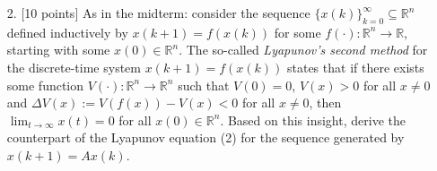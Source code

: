 \documentclass[a4paper,10.5pt]{article}
\begin{document}
\begin{itemize}
\item[2.] $[$10 points$]$ As in the midterm: consider the sequence $\{x(k)\}_{k=0}^\infty \subseteq \mathbb{R}^n$ defined inductively by 
$x(k+1)=f(x(k))$ for some $f(\cdot):\mathbb{R}^n \rightarrow \mathbb{R}$, starting with some $x(0)\in \mathbb{R}^n$. The so-called \emph{Lyapunov's second method} for the discrete-time system $x(k+1)=f(x(k))$ states that if there exists some function $V(\cdot):\mathbb{R}^n \rightarrow \mathbb{R}^n$ such that $V(0)=0$, $V(x) > 0$ for all $x\neq 0$ and $\Delta V(x):=V(f(x)) - V(x)<0$ for all $x\neq 0$, then $\lim_{t \rightarrow \infty} x(t) =0$ for all $x(0) \in \mathbb{R}^n$. Based on this insight, derive the counterpart of the Lyapunov equation (2) for the sequence generated by $x(k+1)=Ax(k)$.
\end{itemize}
\end{document}
